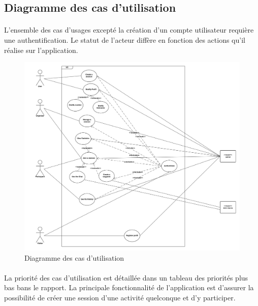 \documentclass[titlepage, 12pt]{report}
\begin{document}
\subsection{Diagramme des cas d'utilisation}

\paragraph{}L'ensemble des cas d'usages excepté la création d'un compte utilisateur requière une authentification. Le statut de l'acteur diffère en fonction des actions qu'il réalise sur l'application. 

\begin{figure}[!h]
\caption{Diagramme des cas d'utilisation}
\label{use_case_diagram}
\centering
\includegraphics[scale=0.5]{Images/diagram/use_case_diagram.png}
\end{figure}

\clearpage

\paragraph{}La priorité des cas d'utilisation est détaillée dans un tableau des priorités plus bas bans le rapport. La principale fonctionnalité de l'application est d'assurer la possibilité de créer une session d'une activité quelconque et d'y participer.
\end{document}
